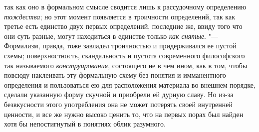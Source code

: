 так как оно в формальном смысле сводится лишь к рассудочному
определению {\em тождества};
но этот момент появляется в троичности определений, так как
третье есть единство двух первых определений, последние же, ввиду того что
они суть разные, могут находиться в единстве только
{\em как снятые}. "---
Формализм, правда, тоже завладел троичностью и
придерживался ее пустой схемы; поверхностность, скандальность и пустота
современного философского так называемого {\em конструирования},
состоящего не в чем ином, как в том, чтобы повсюду наклеивать
эту формальную схему без понятия и имманентного определения и пользоваться
ею для расположения материала во внешнем порядке, сделали указанную форму
скучной и приобрели ей дурную
славу.
Но из-за безвкусности этого употребления она не может
потерять своей внутренней ценности, и все же нужно высоко ценить то, что на
первых порах был найден хотя бы непостигнутый в понятиях облик разумного.

